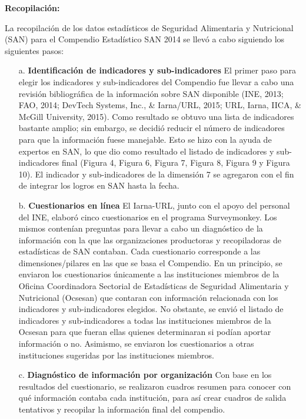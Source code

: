 %

\newpage



\noindent\textbf{Recopilación:}

La recopilación de los datos estadísticos de Seguridad Alimentaria y Nutricional (SAN) para el Compendio Estadístico SAN 2014 se llevó a cabo siguiendo los siguientes pasos:
\begin{itemize}
	\item[a.]	{\textbf{Identificación de indicadores y sub-indicadores} El primer paso para elegir los indicadores y sub-indicadores del Compendio fue llevar a cabo una revisión bibliográfica de la información sobre SAN disponible (INE, 2013; FAO, 2014; DevTech Systems, Inc., \& Iarna/URL, 2015; URL, Iarna, IICA, \& McGill University, 2015). Como resultado se obtuvo una lista de indicadores bastante amplio; sin embargo, se decidió reducir el número de indicadores para que la información fuese manejable. Esto se hizo con la ayuda de expertos en SAN, lo que dio como resultado el listado de indicadores y sub-indicadores final (Figura 4,  Figura 6, Figura 7, Figura 8, Figura 9 y Figura 10). El indicador y sub-indicadores de la dimensión 7 se agregaron con el fin de integrar los logros en SAN hasta la fecha. }

\item[b.]	\textbf{Cuestionarios en línea} El Iarna-URL, junto con el apoyo del personal del INE, elaboró cinco cuestionarios en el programa Surveymonkey. Los mismos contenían preguntas para llevar a cabo un diagnóstico de la información con la que las organizaciones productoras y recopiladoras de estadísticas de SAN contaban. Cada cuestionario corresponde a las dimensiones/pilares en las que se basa el Compendio. En un principio, se enviaron los cuestionarios únicamente a las instituciones miembros de la Oficina Coordinadora Sectorial de Estadísticas de Seguridad Alimentaria y Nutricional (Ocsesan) que contaran con información relacionada con los indicadores y sub-indicadores elegidos. No obstante, se envió el listado de indicadores y sub-indicadores a todas las instituciones miembros de la Ocsesan para que fueran ellas quienes determinaran si podían aportar información o no. Asimismo, se enviaron los cuestionarios a otras instituciones sugeridas por las instituciones miembros.


\item[c.]	\textbf{Diagnóstico de información por organización} Con base en los resultados del cuestionario, se realizaron cuadros resumen para conocer con qué información contaba cada institución, para así crear cuadros de salida tentativos y recopilar la información final del compendio.


\end{itemize}
